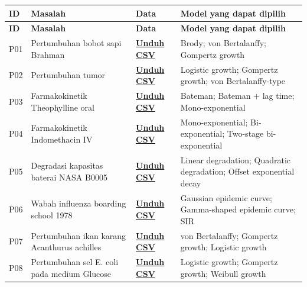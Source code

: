 \documentclass[11pt,a4paper]{article}
\begin{document}
\begin{longtable}{L{0.7cm} L{4.0cm} L{2.0cm} L{7.2cm}}
\toprule
\textbf{ID} & \textbf{Masalah} & \textbf{Data} & \textbf{Model yang dapat dipilih} \\
\midrule
\endfirsthead
\toprule
\textbf{ID} & \textbf{Masalah} & \textbf{Data} & \textbf{Model yang dapat dipilih} \\
\midrule
\endhead
P01 & Pertumbuhan bobot sapi Brahman & \href{https://raw.githubusercontent.com/fauzirifky/Pemodelan-Komputasi-dan-Analisis-Numerik/main/Tugas_Besar/data/P01_brahman_cattle.csv}{\textbf{Unduh CSV}} & Brody; von Bertalanffy; Gompertz growth \\
P02 & Pertumbuhan tumor & \href{https://raw.githubusercontent.com/fauzirifky/Pemodelan-Komputasi-dan-Analisis-Numerik/main/Tugas_Besar/data/P02_tumor_growth.csv}{\textbf{Unduh CSV}} & Logistic growth; Gompertz growth; von Bertalanffy-type \\
P03 & Farmakokinetik Theophylline oral & \href{https://raw.githubusercontent.com/fauzirifky/Pemodelan-Komputasi-dan-Analisis-Numerik/main/Tugas_Besar/data/P03_theophylline.csv}{\textbf{Unduh CSV}} & Bateman; Bateman + lag time; Mono-exponential \\
P04 & Farmakokinetik Indomethacin IV & \href{https://raw.githubusercontent.com/fauzirifky/Pemodelan-Komputasi-dan-Analisis-Numerik/main/Tugas_Besar/data/P04_indomethacin.csv}{\textbf{Unduh CSV}} & Mono-exponential; Bi-exponential; Two-stage bi-exponential \\
P05 & Degradasi kapasitas baterai NASA B0005 & \href{https://raw.githubusercontent.com/fauzirifky/Pemodelan-Komputasi-dan-Analisis-Numerik/main/Tugas_Besar/data/P05_nasa_b0005.csv}{\textbf{Unduh CSV}} & Linear degradation; Quadratic degradation; Offset exponential decay \\
P06 & Wabah influenza boarding school 1978 & \href{https://raw.githubusercontent.com/fauzirifky/Pemodelan-Komputasi-dan-Analisis-Numerik/main/Tugas_Besar/data/P06_influenza_boarding_school.csv}{\textbf{Unduh CSV}} & Gaussian epidemic curve; Gamma-shaped epidemic curve; SIR \\
P07 & Pertumbuhan ikan karang Acanthurus achilles & \href{https://raw.githubusercontent.com/fauzirifky/Pemodelan-Komputasi-dan-Analisis-Numerik/main/Tugas_Besar/data/P07_coral_reef_fish.csv}{\textbf{Unduh CSV}} & von Bertalanffy; Gompertz growth; Logistic growth \\
P08 & Pertumbuhan sel E. coli pada medium Glucose & \href{https://raw.githubusercontent.com/fauzirifky/Pemodelan-Komputasi-dan-Analisis-Numerik/main/Tugas_Besar/data/P08_microbial_growth.csv}{\textbf{Unduh CSV}} & Logistic growth; Gompertz growth; Weibull growth \\

\end{longtable}
\end{document}
